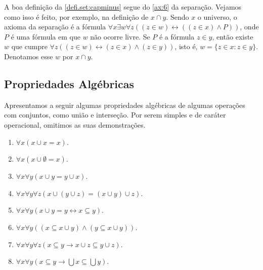 \begin{remark}
    A boa definição da \cref{defi.set:capminus} segue do \cref{ax:6} da separação. Vejamos como isso é feito, por exemplo, na definição de $x \cap y$. Sendo $x$ o universo, o axioma da separação é a fórmula $\forall x \exists w \forall z ((z \in w) \leftrightarrow ((z \in x) \land P) )$, onde $P$ é uma fórmula em que $w$ não ocorre livre. Se $P$ é a fórmula $z \in y$, então existe $w$ que cumpre $\forall z ( (z \in w) \leftrightarrow (z \in x) \land (z \in y) )$, isto é, $w = \{z \in x : z \in y \}$. Denotamos esse $w$ por $x \cap y$.
\end{remark}

\subsection{Propriedades Algébricas}

Apresentamos a seguir algumas propriedades algébricas de algumas operações com conjuntos, como união e interseção. Por serem simples e de caráter operacional, omitimos as suas demonstrações.

\begin{proposition}
    \leavevmode
        \begin{enumerate}[leftmargin=*, align=left, label=\textbf{(\alph*)}]
            \item $\forall x (x \cup x = x)$.
            \item $\forall x (x \cup \emptyset = x)$.
            \item $\forall x \forall y (x \cup y = y \cup x)$.
            \item $\forall x \forall y \forall z (x \cup (y \cup z) = (x \cup y) \cup z)$.
            \item $\forall x \forall y (x \cup y = y \leftrightarrow x \subseteq y)$.
            \item $\forall x \forall y ( (x \subseteq x \cup y) \land (y \subseteq x \cup y))$.
            \item $\forall x \forall y \forall z (x \subseteq y \rightarrow x \cup z \subseteq y \cup z )$.
            \item $\forall x \forall y (x \subseteq y \rightarrow \bigcup x \subseteq \bigcup y)$.
        \end{enumerate}
\end{proposition}

